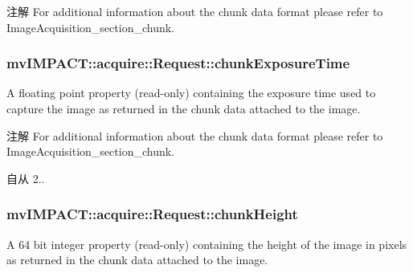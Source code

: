\begin{DoxyNote}{注解}
For additional information about the chunk data format please refer to Image\+Acquisition\+\_\+section\+\_\+chunk. 
\end{DoxyNote}
\hypertarget{classmv_i_m_p_a_c_t_1_1acquire_1_1_request_a3a511879bedfe4c8104b12e512144bed}{
\subsubsection[{chunk\+Exposure\+Time}]{ mv\+I\+M\+P\+A\+C\+T\+::acquire\+::\+Request\+::chunk\+Exposure\+Time}}\label{classmv_i_m_p_a_c_t_1_1acquire_1_1_request_a3a511879bedfe4c8104b12e512144bed}


A floating point property {\bfseries }(read-\/only) containing the exposure time used to capture the image as returned in the chunk data attached to the image. 

\begin{DoxyNote}{注解}
For additional information about the chunk data format please refer to Image\+Acquisition\+\_\+section\+\_\+chunk.
\end{DoxyNote}
\begin{DoxySince}{自从}
2.. 
\end{DoxySince}
\hypertarget{classmv_i_m_p_a_c_t_1_1acquire_1_1_request_a4e0047f0e5ea3bd83ebb77786a787f45}{
\subsubsection[{chunk\+Height}]{ mv\+I\+M\+P\+A\+C\+T\+::acquire\+::\+Request\+::chunk\+Height}}\label{classmv_i_m_p_a_c_t_1_1acquire_1_1_request_a4e0047f0e5ea3bd83ebb77786a787f45}


A 64 bit integer property {\bfseries }(read-\/only) containing the height of the image in pixels as returned in the chunk data attached to the image. 

